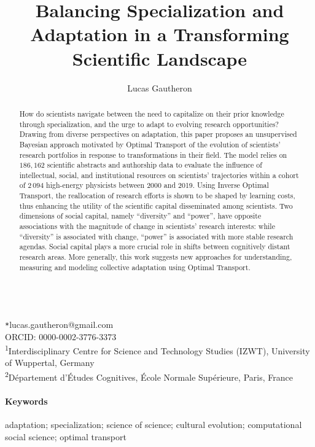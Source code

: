 \documentclass{article}
\title{Balancing Specialization and Adaptation in a Transforming Scientific Landscape}
\author{Lucas Gautheron\protect\affmark[1,2]}
\date{}
\newcommand*{\affaddr}[1]{#1}
\newcommand*{\affmark}[1][*]{\textsuperscript{#1}}
\newcommand*{\email}[1][*]{\texttt{#1}}
\begin{document}
\maketitle


\begin{abstract}
How do scientists navigate between the need to capitalize on their prior knowledge through specialization, and the urge to adapt to evolving research opportunities? Drawing from diverse perspectives on adaptation, this paper proposes an unsupervised Bayesian approach motivated by Optimal Transport of the evolution of scientists' research portfolios in response to transformations in their field. The model relies on $186,162$ scientific abstracts and authorship data to evaluate the influence of intellectual, social, and institutional resources on scientists' trajectories within a cohort of $2\,094$ high-energy physicists between 2000 and 2019. Using Inverse Optimal Transport, the reallocation of research efforts is shown to be shaped by learning costs, thus enhancing the utility of the scientific capital disseminated among scientists. Two dimensions of social capital, namely ``diversity'' and ``power'', have opposite associations with the magnitude of change in scientists' research interests: while ``diversity'' is associated with change, ``power'' is associated with more stable research agendas. Social capital plays a more crucial role in shifts between cognitively distant research areas. More generally, this work suggests new approaches for understanding, measuring and modeling collective adaptation using Optimal Transport.
\end{abstract}


\ \\

  \email{lucas.gautheron@gmail.com}\\ORCID: 0000-0002-3776-3373\\
 \affaddr{\affmark[1]Interdisciplinary Centre for Science and Technology Studies (IZWT), University of Wuppertal, Germany}\\
 \affaddr{\affmark[2]Département d'Études Cognitives, École Normale Supérieure, Paris, France}

 \paragraph{Keywords}{adaptation; specialization; science of science;  cultural evolution; computational social science; optimal transport}
\end{document}
